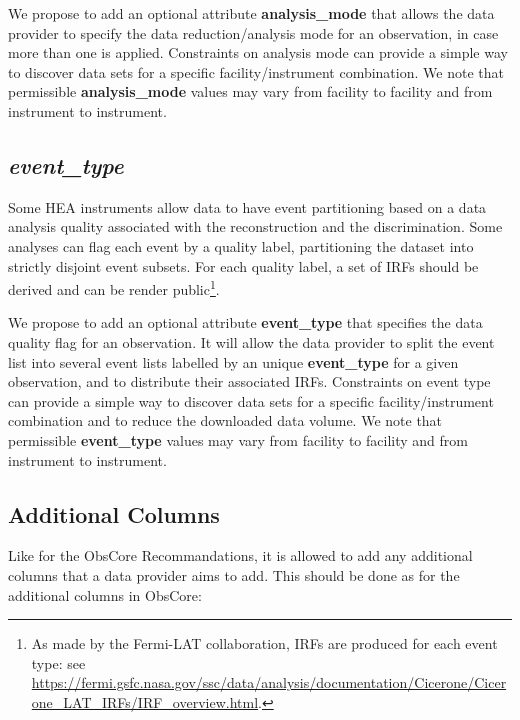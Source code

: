 \documentclass[11pt,a4paper]{ivoa}
\begin{document}
We propose to add an optional attribute {\bf analysis\_mode} that allows the data provider to specify the data reduction/analysis mode for an observation, in case more than one is applied. Constraints on analysis mode can provide a simple way to discover data sets for a specific facility/instrument combination. We note that permissible {\bf analysis\_mode} values may vary from facility to facility and from instrument to instrument.


\subsection{{\em event\_type}}
\label{sec:evttype}

Some \gls{HEA} instruments allow data to have event partitioning based on a data analysis quality associated with the reconstruction and the discrimination. Some analyses can flag each event by a quality label, partitioning the dataset into strictly disjoint event subsets. For each quality label, a set of \glspl{IRF} should be derived and can be render public\footnote{As made by the Fermi-LAT collaboration, \glspl{IRF} are produced for each event type: see \url{https://fermi.gsfc.nasa.gov/ssc/data/analysis/documentation/Cicerone/Cicerone_LAT_IRFs/IRF_overview.html}.}.

We propose to add an optional attribute {\bf event\_type} that specifies the data quality flag for an observation. It will allow the data provider to split the event list into several event lists labelled by an unique {\bf event\_type} for a given observation, and to distribute their associated \glspl{IRF}. Constraints on event type can provide a simple way to discover data sets for a specific facility/instrument combination and to reduce the downloaded data volume. We note that permissible {\bf event\_type} values may vary from facility to facility and from instrument to instrument.

\subsection{Additional Columns}

Like for the ObsCore Recommandations, it is allowed to add any additional columns that a data provider aims to add. This should be done as for the additional columns in ObsCore:
\end{document}

